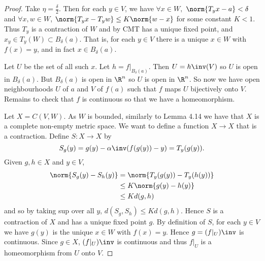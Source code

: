\begin{proof}
Take $\eta = \frac{\delta}{2}$. Then for each $y\in V$, we have $\forall x\in W,$ $\norm{T_yx-a}<\delta$ and $\forall x,w\in W$, $\norm{T_yx - T_yw}\leq K\norm{w-x}$ for some constant $K<1$. Thus $T_y$ is a contraction of $W$ and by CMT has a unique fixed point, and $x_y\in T_y(W)\subset B_\delta(a)$. That is, for each $y\in V$ there is a unique $x\in W$ with $f(x) = y$, and in fact $x\in B_\delta(a)$. 

Let $U$ be the set of all such $x$. Let $h=f|_{B_\delta(a)}$. Then $U=h\inv(V)$ so $U$ is open in $B_\delta(a)$. But $B_\delta(a)$ is open in $\R^n$ so $U$ is open in $\R^n$. So now we have open neighbourhoods $U$ of $a$ and $V$ of $f(a)$ such that $f$ maps $U$ bijectively onto $V$. Remains to check that $f$ is continuous so that we have a homeomorphism.

Let $X = C(V,W)$. As $W$ is bounded, similarly to Lemma 4.14 we have that $X$ is a complete non-empty metric space. We want to define a function $X\to X$ that is a contraction. Define $S:X\to X$ by \[S_g(y) = g(y) - \alpha\inv(f(g(y))-y) = T_y(g(y)). \]
Given $g,h\in X$ and $y\in V$,
\begin{align*}
    \norm{S_g(y) - S_h(y)} &= \norm{T_y(g(y)) - T_y(h(y))}\\
    &\leq K\norm{g(y) - h(y)}\\
    &\leq Kd(g,h)
\end{align*}
and so by taking sup over all $y$, $d(S_g,S_h) \leq Kd(g,h)$. Hence $S$ is a contraction of $X$ and has a unique fixed point $g$. By definition of $S$, for each $y\in V$ we have $g(y)$ is the unique $x\in W$ with $f(x) = y$. Hence $g = (f|_U)\inv$ is continuous. Since $g\in X$, $(f|_U)\inv$ is continuous and thus $f|_U$ is a homeomorphism from $U$ onto $V$.
\end{proof}
